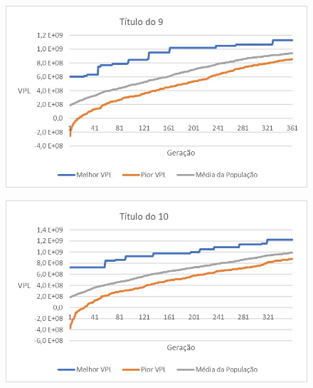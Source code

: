 \documentclass[12pt,a4paper]{report}
\begin{document}
\begin{figure}[H]
\centering

\includegraphics[scale=1]{9}

\end{figure}

\begin{figure}[H]
\centering

\includegraphics[scale=1]{10}

\end{figure}
\end{document}
